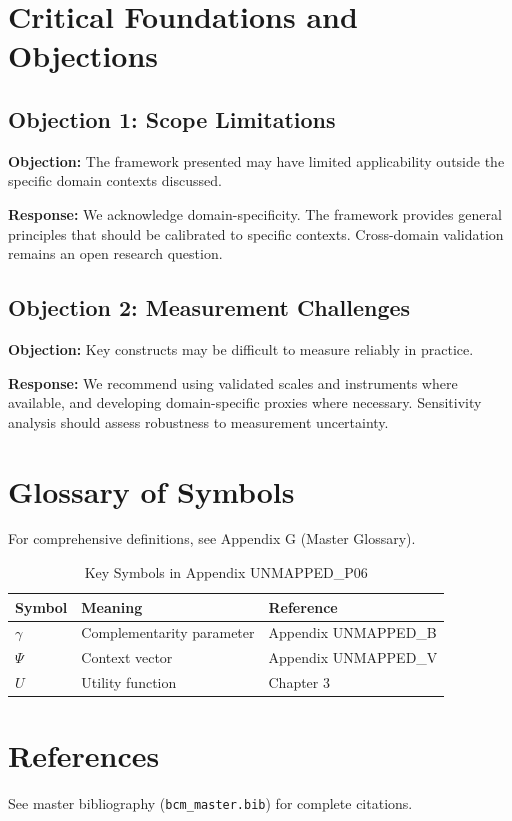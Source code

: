 \section{Critical Foundations and Objections}
\label{sec:p06-foundations}

\subsection{Objection 1: Scope Limitations}

\textbf{Objection:} The framework presented may have limited applicability
outside the specific domain contexts discussed.

\textbf{Response:} We acknowledge domain-specificity. The framework provides
general principles that should be calibrated to specific contexts. Cross-domain
validation remains an open research question.

\subsection{Objection 2: Measurement Challenges}

\textbf{Objection:} Key constructs may be difficult to measure reliably in
practice.

\textbf{Response:} We recommend using validated scales and instruments where
available, and developing domain-specific proxies where necessary. Sensitivity
analysis should assess robustness to measurement uncertainty.



\section{Glossary of Symbols}
\label{sec:p06-glossary}

For comprehensive definitions, see Appendix G (Master Glossary).

\begin{table}[htbp]
\centering
\caption{Key Symbols in Appendix UNMAPPED_P06}
\begin{tabular}{lll}
\toprule
\textbf{Symbol} & \textbf{Meaning} & \textbf{Reference} \\
\midrule
$\gamma$ & Complementarity parameter & Appendix UNMAPPED_B \\
$\Psi$ & Context vector & Appendix UNMAPPED_V \\
$U$ & Utility function & Chapter 3 \\
\bottomrule
\end{tabular}
\end{table}


\section{References}
\label{sec:p06-references}

See master bibliography (\texttt{bcm\_master.bib}) for complete citations.

\nocite{bcm_master}

